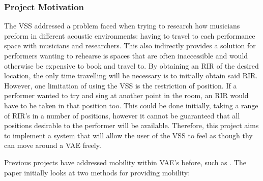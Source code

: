 \documentclass[../../main.tex]{subfiles}
\begin{document}
		\subsubsection{Project Motivation}
			

			The \ac{VSS} addressed a problem faced when trying to research how musicians preform in different acoustic environments: having to travel to each performance space with musicians and researchers. This also indirectly provides a solution for performers wanting to rehearse is spaces that are often inaccessible and would otherwise be expensive to book and travel to. By obtaining an \ac{RIR} of the desired location, the only time travelling will be necessary is to initially obtain said \ac{RIR}. However, one limitation of using the \ac{VSS} is the restriction of position. If a performer wanted to try and sing at another point in the room, an \ac{RIR} would have to be taken in that position too. This could be done initially, taking a range of \ac{RIR}'s in a number of positions, however it cannot be guaranteed that all positions desirable to the performer will be available. Therefore, this project aims to implement a system that will allow the user of the \ac{VSS} to feel as though thy can move around a \ac{VAE} freely.


			Previous projects have addressed mobility within \ac{VAE}'s before, such as \cite{Savioja1999}. The paper initially looks at two methods for providing mobility:

\end{document}
